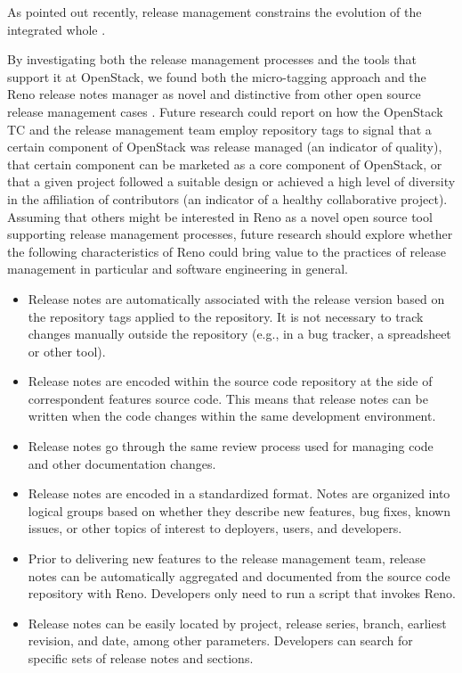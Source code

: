 \documentclass[dvipsnames]{interact}
\theoremstyle{plain}\newtheorem{theorem}{Theorem}[section]
\theoremstyle{definition}
\theoremstyle{remark}
\begin{document}
As pointed out recently, release management constrains the evolution of the integrated whole  \citep[pp 4]{PooCaamano2016}.
 
 




By investigating both the release management processes and the tools that support it at OpenStack, we found both the micro-tagging approach and the Reno release notes manager as novel and distinctive from other open source release management cases \citep[c.f.,][]{MichlmayrFitzgerald_et_al2015,PooCaamanoKnauss_et_al2017}. Future research could report on how the OpenStack  \ac{TC} and the release management team employ repository tags to signal that a certain component of OpenStack was release managed (an indicator of quality), that certain component can be marketed as a core component of OpenStack, or that a given project followed a suitable design or achieved a high level of diversity in the affiliation of contributors (an indicator of a healthy collaborative project).  Assuming that others might be interested in Reno as a novel open source tool supporting release management processes, future research should explore whether the following characteristics of Reno could bring value to the practices of release management in particular and software engineering in general. 

\begin{itemize}
 \item Release notes are automatically associated with the release version based on the repository tags applied to the repository. It is not necessary to track changes manually outside the repository (e.g., in a bug tracker, a spreadsheet or other tool).
 \item Release notes are encoded within the source code repository at the side of correspondent features source code. This means that release notes can be written when the code changes within the same development environment.
 \item Release notes go through the same review process used for managing code and other documentation changes.
 \item Release notes are encoded in a standardized format. Notes are organized into logical groups based on whether they describe new features, bug fixes, known issues, or other topics of interest to deployers, users, and developers. 
 \item Prior to delivering new features to the release management team, release notes can be automatically aggregated and documented from the source code repository with Reno.  Developers only need to run a script that invokes Reno. 
\item Release notes can be easily located by project, release series, branch, earliest revision, and date, among other parameters.  Developers can search for specific sets of release notes and sections. 
\end{itemize}
\end{document}
